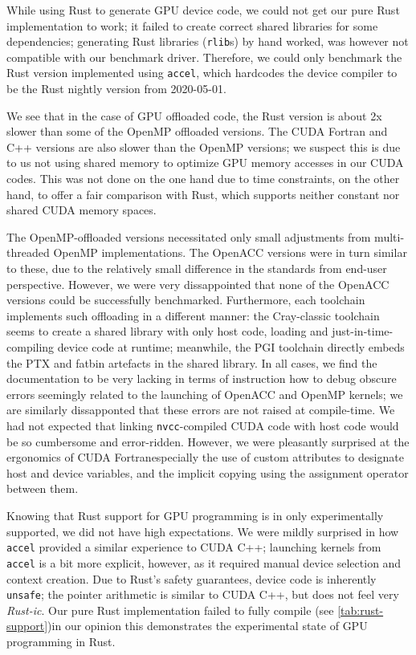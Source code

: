 \documentclass[british]{scrreprt}
\begin{document}
While using Rust to generate GPU device code, we could not get our pure Rust implementation to work; it failed to create correct shared libraries for some dependencies; generating Rust libraries (\texttt{rlib}s) by hand worked, was however not compatible with our benchmark driver. Therefore, we could only benchmark the Rust version implemented using \texttt{accel}, which hardcodes the device compiler to be the Rust nightly version from 2020-05-01.

We see that in the case of GPU offloaded code, the Rust version is about 2x slower than some of the OpenMP offloaded versions. The CUDA Fortran and C++ versions are also slower than the OpenMP versions; we suspect this is due to us not using shared memory to optimize GPU memory accesses in our CUDA codes. This was not done on the one hand due to time constraints, on the other hand, to offer a fair comparison with Rust, which supports neither constant nor shared CUDA memory spaces.

The OpenMP-offloaded versions necessitated only small adjustments from multi-threaded OpenMP implementations. The OpenACC versions were in turn similar to these, due to the relatively small difference in the standards from end-user perspective. However, we were very dissappointed that none of the OpenACC versions could be successfully benchmarked. Furthermore, each toolchain implements such offloading in a different manner: the Cray-classic toolchain seems to create a shared library with only host code, loading and just-in-time-compiling device code at runtime; meanwhile, the PGI toolchain directly embeds the PTX and fatbin artefacts in the shared library. In all cases, we find the documentation to be very lacking in terms of instruction how to debug obscure errors seemingly related to the launching of OpenACC and OpenMP kernels; we are similarly dissapponted that these errors are not raised at compile-time. We had not expected that linking \texttt{nvcc}-compiled CUDA code with host code would be so cumbersome and error-ridden. However, we were pleasantly surprised at the ergonomics of CUDA Fortran\textemdash{}especially the use of custom attributes to designate host and device variables, and the implicit copying using the assignment operator between them.

Knowing that Rust support for GPU programming is in only experimentally supported, we did not have high expectations. We were mildly surprised in how \texttt{accel} provided a similar experience to CUDA C++; launching kernels from \texttt{accel} is a bit more explicit, however, as it required manual device selection and context creation. Due to Rust's safety guarantees, device code is inherently \texttt{unsafe}; the pointer arithmetic is similar to CUDA C++, but does not feel very \emph{Rust-ic}. Our pure Rust implementation failed to fully compile (see \cref{tab:rust-support})\textemdash{}in our opinion this demonstrates the experimental state of GPU programming in Rust.
\end{document}
